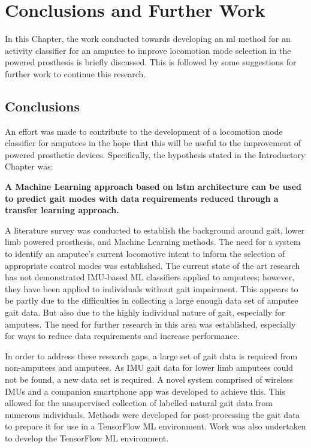 \chapter{Conclusions and Further Work}
\label{chp:conclusions}
In this Chapter, the work conducted towards developing an \acrshort{ml} method for an activity classifier for an amputee to improve locomotion mode selection in the powered prosthesis is briefly discussed. This is followed by some suggestions for further work to continue this research.

\section{Conclusions} %
An effort was made to contribute to the development of a locomotion mode classifier for amputees in the hope that this will be useful to the improvement of powered prosthetic devices. Specifically, the hypothesis stated in the Introductory Chapter was:

\textbf{A Machine Learning approach based on \acrfull{lstm} architecture can be used to predict gait modes with data requirements reduced through a transfer learning approach.}

A literature survey was conducted to establish the background around gait, lower limb powered prosthesis, and Machine Learning methods. The need for a system to identify an amputee's current locomotive intent to inform the selection of appropriate control modes was established. The current state of the art research has not demonstrated IMU-based ML classifiers applied to amputees; however, they have been applied to individuals without gait impairment. This appears to be partly due to the difficulties in collecting a large enough data set of amputee gait data. But also due to the highly individual nature of gait, especially for amputees. The need for further research in this area was established, especially for ways to reduce data requirements and increase performance.

In order to address these research gaps, a large set of gait data is required from non-amputees and amputees. As IMU gait data for lower limb amputees could not be found, a new data set is required. A novel system comprised of wireless IMUs and a companion smartphone app was developed to achieve this. This allowed for the unsupervised collection of labelled natural gait data from numerous individuals. Methods were developed for post-processing the gait data to prepare it for use in a TensorFlow ML environment. Work was also undertaken to develop the TensorFlow ML environment.

